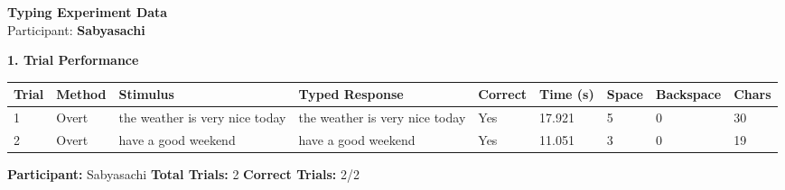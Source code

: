 \documentclass[10pt,a4paper]{article}
\begin{document}

\begin{center}
    {\Large\bfseries Typing Experiment Data}\\
    \vspace{2pt}
    Participant: \textbf{Sabyasachi}
\end{center}

\vspace{0.25cm}


\noindent
{\large\bfseries 1. Trial Performance}

\vspace{0.08cm}

\begin{center}
\begin{tabularx}{\textwidth}{
    C{0.45in}
    C{0.65in}
    L{2.35in}
    L{2.55in}
    C{0.65in}
    C{0.65in}
    C{0.55in}
    C{0.75in}
    C{0.55in}
}
\toprule

\textbf{Trial} &
\textbf{Method} &
\textbf{Stimulus} &
\textbf{Typed Response} &
\textbf{Correct} &
\textbf{Time (s)} &
\textbf{Space} &
\textbf{Backspace} &
\textbf{Chars}
\\

\midrule

1 &
Overt &
the weather is very nice today &
the weather is very nice today &
Yes &
17.921 &
5 &
0 &
30
\\

2 &
Overt &
have a good weekend &
have a good weekend &
Yes &
11.051 &
3 &
0 &
19
\\

\bottomrule
\end{tabularx}
\end{center}

\vfill


\noindent
\textbf{Participant:} Sabyasachi
\hfill
\textbf{Total Trials:} 2
\hfill
\textbf{Correct Trials:} 2/2
\end{document}
